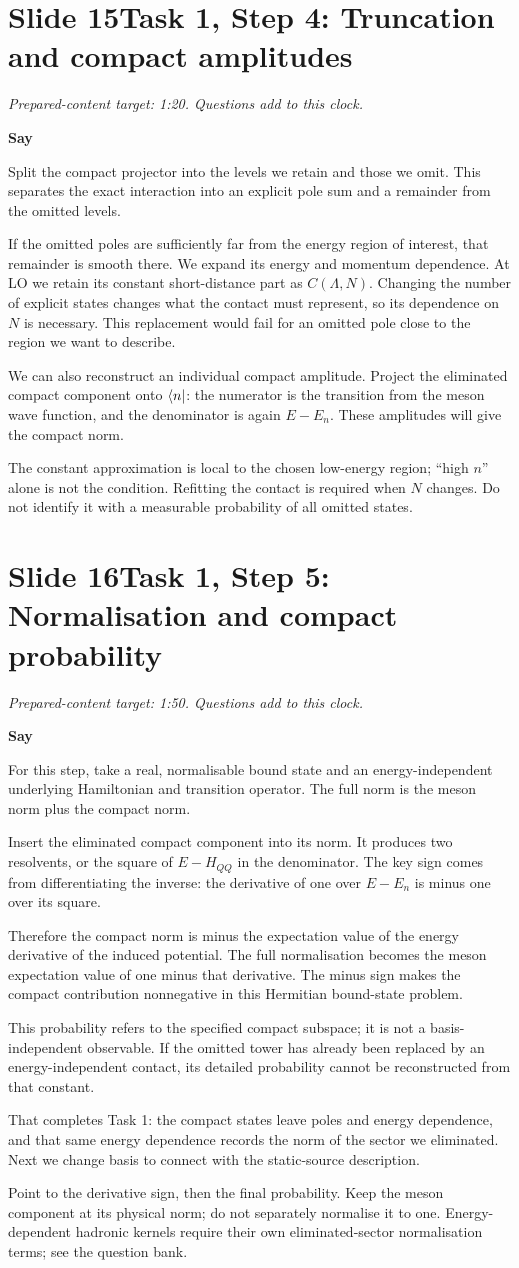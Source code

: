\documentclass[11pt,a4paper]{article}
\newcommand{\cue}[1]{\begin{private}#1\end{private}}
\newenvironment{speech}{\par\textbf{Say}\par}{\par}
\newcommand{\slidenote}[3]{%
  \clearpage
  \pdfbookmark[1]{Slide #1}{slide-#1}%
  \section*{Slide #1\quad #2}
  \textit{Prepared-content target: #3. Questions add to this clock.}\par
}
\begin{document}
\slidenote{15}{Task 1, Step 4: Truncation and compact amplitudes}{1:20}
\begin{speech}
Split the compact projector into the levels we retain and those we omit.
This separates the exact interaction into an explicit pole sum and a
remainder from the omitted levels.

If the omitted poles are sufficiently far from the energy region of
interest, that remainder is smooth there. We expand its energy and
momentum dependence. At LO we retain its constant short-distance part
as $C(\Lambda,N)$. Changing the number of explicit states changes what
the contact must represent, so its dependence on $N$ is necessary.
This replacement would fail for an omitted pole close to the region
we want to describe.

We can also reconstruct an individual compact amplitude. Project the
eliminated compact component onto $\bra n$: the numerator is the
transition from the meson wave function, and the denominator is again
$E-E_n$. These amplitudes will give the compact norm.
\end{speech}
\cue{The constant approximation is local to the chosen low-energy region;
``high $n$'' alone is not the condition. Refitting the contact is required
when $N$ changes. Do not identify it with a measurable probability of
all omitted states.}

\slidenote{16}{Task 1, Step 5: Normalisation and compact probability}{1:50}
\begin{speech}
For this step, take a real, normalisable bound state and an
energy-independent underlying Hamiltonian and transition operator.
The full norm is the meson norm plus the compact norm.

Insert the eliminated compact component into its norm. It produces
two resolvents, or the square of $E-H_{QQ}$ in the denominator.
The key sign comes from differentiating the inverse: the derivative
of one over $E-E_n$ is minus one over its square.

Therefore the compact norm is minus the expectation value of the
energy derivative of the induced potential. The full normalisation
becomes the meson expectation value of one minus that derivative.
The minus sign makes the compact contribution nonnegative in this
Hermitian bound-state problem.

This probability refers to the specified compact subspace; it is not
a basis-independent observable. If the omitted tower has already been
replaced by an energy-independent contact, its detailed probability
cannot be reconstructed from that constant.

That completes Task 1: the compact states leave poles and energy
dependence, and that same energy dependence records the norm of the
sector we eliminated. Next we change basis to connect with the
static-source description.
\end{speech}
\cue{Point to the derivative sign, then the final probability. Keep the meson
component at its physical norm; do not separately normalise it to one.
Energy-dependent hadronic kernels require their own eliminated-sector
normalisation terms; see the question bank.}
\end{document}
